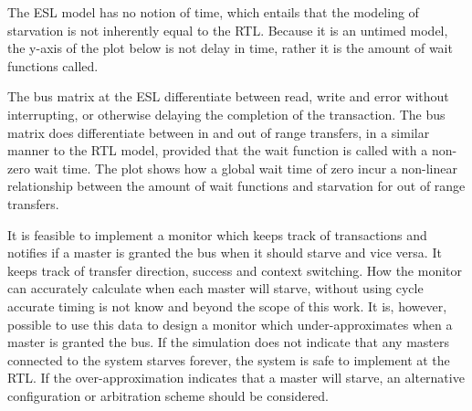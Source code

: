 The ESL model has no notion of time, which entails that the modeling of starvation is not inherently equal to the RTL. Because it is an untimed model, the y-axis of the plot below is not delay in time, rather it is the amount of wait functions called. \par
The bus matrix at the ESL differentiate between read, write and error without interrupting, or otherwise delaying the completion of the transaction. The bus matrix does differentiate between in and out of range transfers, in a similar manner to the RTL model, provided that the wait function is called with a non-zero wait time. 
The plot shows how a global wait time of zero incur a non-linear relationship between the amount of wait functions and starvation for out of range transfers.


It is feasible to implement a monitor which keeps track of transactions and notifies if a master is granted the bus when it should starve and vice versa. It keeps track of transfer direction, success and context switching. How the monitor can accurately calculate when each master will starve, without using cycle accurate timing is not know and beyond the scope of this work. It is, however, possible to use this data to design a monitor which under-approximates when a master is granted the bus. If the simulation does not indicate that any masters connected to the system starves forever, the system is safe to implement at the RTL. If the over-approximation indicates that a master will starve, an alternative configuration or arbitration scheme should be considered. 



